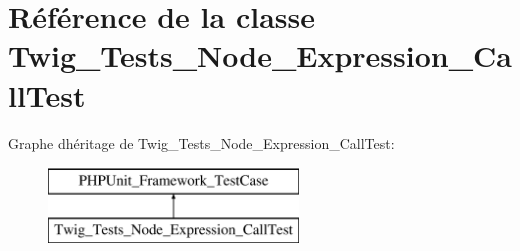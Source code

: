 \hypertarget{class_twig___tests___node___expression___call_test}{}\section{Référence de la classe Twig\+\_\+\+Tests\+\_\+\+Node\+\_\+\+Expression\+\_\+\+Call\+Test}
\label{class_twig___tests___node___expression___call_test}
Graphe d\textquotesingle{}héritage de Twig\+\_\+\+Tests\+\_\+\+Node\+\_\+\+Expression\+\_\+\+Call\+Test\+:\begin{figure}[H]
\begin{center}
\leavevmode
\includegraphics[height=2.000000cm]{class_twig___tests___node___expression___call_test}
\end{center}
\end{figure}
